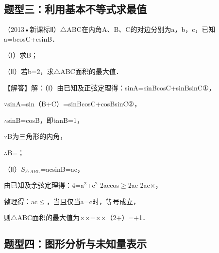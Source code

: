 \subsection{题型三：利用基本不等式求最值}

\begin{question}
（2013•新课标Ⅱ）$\triangle$ABC在内角A、B、C的对边分别为a，b，c，已知a=bcosC+csinB．\par
（Ⅰ）求B；\par
（Ⅱ）若b=2，求$\triangle$ABC面积的最大值．\par
\begin{solution}
【解答】解：（Ⅰ）由已知及正弦定理得：sinA=sinBcosC+sinBsinC①，\par
$\because$sinA=sin（B+C）=sinBcosC+cosBsinC②，\par
$\therefore$sinB=cosB，即tanB=1，\par
$\because$B为三角形的内角，\par
$\therefore$B=\allowbreak{}；\par
（Ⅱ）$S_{\triangle ABC}$=\allowbreak{}acsinB=\allowbreak{}ac，\par
由已知及余弦定理得：4=a$^{2}$+c$^{2}$-2accos\allowbreak{}$\geq$2ac-2ac×\allowbreak{}，\par
整理得：ac$\leq$\allowbreak{}，当且仅当a=c时，等号成立，\par
则$\triangle$ABC面积的最大值为\allowbreak{}×\allowbreak{}×\allowbreak{}=\allowbreak{}×\allowbreak{}×（2+\allowbreak{}）=\allowbreak{}+1．\par
\end{solution}
\end{question}

\subsection{题型四：图形分析与未知量表示}

